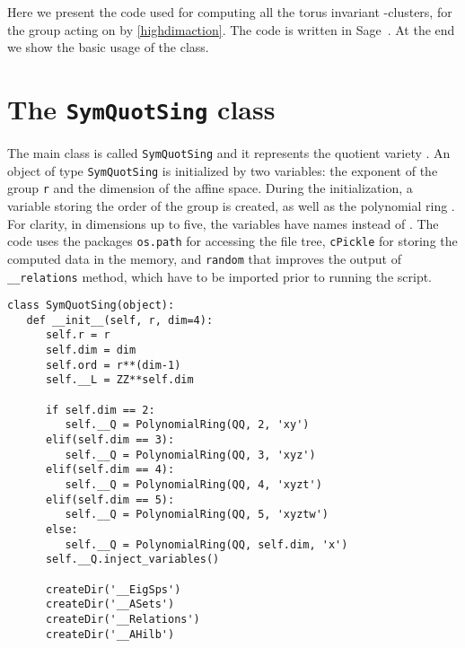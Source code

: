 
Here we present the code used for computing all the torus invariant -clusters, for the group  acting on  by \eqref{highdimaction}. The code is written in Sage~\cite{sagemath}. At the end we show the basic usage of the class.
\vspace{5pt}


\section{The \texttt{SymQuotSing} class}

The main class is called \texttt{SymQuotSing} and it represents the quotient variety .
An object of type \texttt{SymQuotSing} is initialized by two variables: the exponent of the group \texttt{r} and the dimension  of the affine space. During the initialization, a variable storing the order of the group is created, as well as the polynomial ring . For clarity, in dimensions up to five, the variables have names  instead of . The code uses the packages \texttt{os.path} for accessing the file tree, \texttt{cPickle} for storing the computed data in the memory, and \texttt{random} that improves the output of \texttt{\_\_relations} method,  which have to be imported prior to running the script.

\vspace{-10pt}
\singlespacing
\begin{verbatim}
class SymQuotSing(object):
   def __init__(self, r, dim=4):
      self.r = r
      self.dim = dim
      self.ord = r**(dim-1)
      self.__L = ZZ**self.dim
   
      if self.dim == 2:
         self.__Q = PolynomialRing(QQ, 2, 'xy')   
      elif(self.dim == 3):
         self.__Q = PolynomialRing(QQ, 3, 'xyz')
      elif(self.dim == 4):
         self.__Q = PolynomialRing(QQ, 4, 'xyzt')
      elif(self.dim == 5):
         self.__Q = PolynomialRing(QQ, 5, 'xyztw')   
      else:
         self.__Q = PolynomialRing(QQ, self.dim, 'x')
      self.__Q.inject_variables()

      createDir('__EigSps')
      createDir('__ASets')
      createDir('__Relations')
      createDir('__AHilb')	
\end{verbatim}

